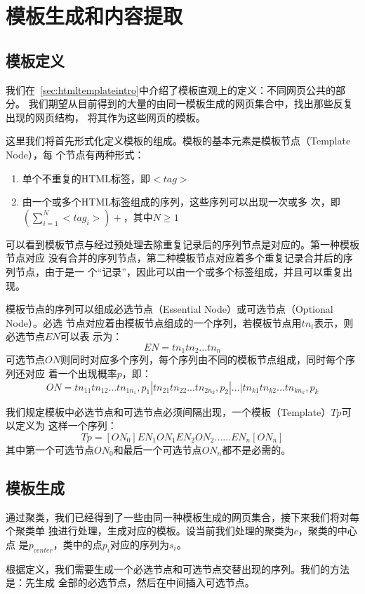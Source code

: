 
\chapter{模板生成和内容提取}
\label{chap:template}
\section{模板定义}
我们在~\ref{sec:htmltemplateintro}中介绍了模板直观上的定义：不同网页公共的部分。
我们期望从目前得到的大量的由同一模板生成的网页集合中，找出那些反复出现的网页结构，
将其作为这些网页的模板。

这里我们将首先形式化定义模板的组成。模板的基本元素是模板节点（Template Node），每
个节点有两种形式：
\begin{enumerate}
\item 单个不重复的HTML标签，即$<tag>$
\item 由一个或多个HTML标签组成的序列，这些序列可以出现一次或多
  次，即$(\sum_{i=1}^N<tag_i>)+$，其中$N \ge 1$
\end{enumerate}
可以看到模板节点与经过预处理去除重复记录后的序列节点是对应的。第一种模板节点对应
没有合并的序列节点，第二种模板节点对应着多个重复记录合并后的序列节点，由于是一
个“记录”，因此可以由一个或多个标签组成，并且可以重复出现。

模板节点的序列可以组成必选节点（Essential Node）或可选节点（Optional Node）。必选
节点对应着由模板节点组成的一个序列，若模板节点用$tn_i$表示，则必选节点$EN$可以表
示为：
\[
EN=tn_1tn_2...tn_n
\]
可选节点$ON$则同时对应多个序列，每个序列由不同的模板节点组成，同时每个序列还对应
着一个出现概率$p$，即：
\[
ON=tn_{11}tn_{12}...tn_{1n_1},p_1|tn_{21}tn_{22}...tn_{2n_2},p_2|...|tn_{k1}tn_{k2}...tn_{kn_k},p_k
\]

我们规定模板中必选节点和可选节点必须间隔出现，一个模板（Template）$Tp$可以定义为
这样一个序列：
\[
Tp=[ON_0]EN_1ON_1EN_2ON_2......EN_n[ON_n]
\]
其中第一个可选节点$ON_0$和最后一个可选节点$ON_n$都不是必需的。
\section{模板生成}
\label{sec:templategen}
通过聚类，我们已经得到了一些由同一种模板生成的网页集合，接下来我们将对每个聚类单
独进行处理，生成对应的模板。设当前我们处理的聚类为$c$，聚类的中心点
是$p_{center}$，类中的点$p_i$对应的序列为$s_i$。

根据定义，我们需要生成一个必选节点和可选节点交替出现的序列。我们的方法是：先生成
全部的必选节点，然后在中间插入可选节点。

